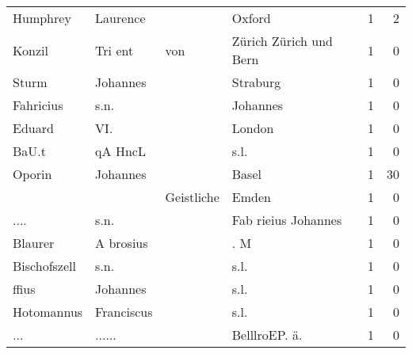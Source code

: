 \begin{center}
\begin{tiny}
\begin{longtabu}{llllrr}
                 Humphrey &                           Laurence &             &                                      Oxford &          1 &         2 \\
                   Konzil &                            Tri ent &         von &                      Zürich Zürich und Bern &          1 &         0 \\
                    Sturm &                           Johannes &             &                                    Straburg &          1 &         0 \\
                Fahricius &                               s.n. &             &                                    Johannes &          1 &         0 \\
                   Eduard &                                VI. &             &                                      London &          1 &         0 \\
                    BaU.t &                            qA HncL &             &                                        s.l. &          1 &         0 \\
                   Oporin &                           Johannes &             &                                       Basel &          1 &        30 \\
                          &                                    &  Geistliche &                                       Emden &          1 &         0 \\
                     .... &                               s.n. &             &                         Fab rieius Johannes &          1 &         0 \\
                  Blaurer &                          A brosius &             &                                         . M &          1 &         0 \\
             Bischofszell &                               s.n. &             &                                        s.l. &          1 &         0 \\
                    ffius &                           Johannes &             &                                        s.l. &          1 &         0 \\
               Hotomannus &                         Franciscus &             &                                        s.l. &          1 &         0 \\
                      ... &                             ...... &             &                              BelllroEP. ä.  &          1 &         0 \\

\end{longtabu}
\end{tiny}
\end{center}
